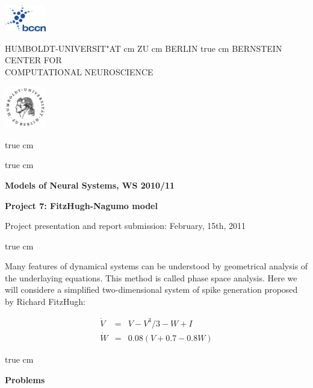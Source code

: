 \documentclass[12pt]{article}
\begin{document}
\parbox{2cm}{
\includegraphics[width=1.8cm]{bccnlogo.pdf}
}
\parbox{11cm}{
\begin{center}
\large HUMBOLDT-UNIVERSIT"AT  cm ZU  cm BERLIN
 true cm
\mgross BERNSTEIN CENTER FOR\\ COMPUTATIONAL NEUROSCIENCE
\end{center}
}
\parbox{2cm}
{
\hfill
\includegraphics[width=1.8cm]{hublogo.pdf}
}

 true cm



 true cm
\centerline{\bf Models of Neural Systems, WS 2010/11}
\centerline{\bf Project 7: FitzHugh-Nagumo model}
\centerline{Project presentation and report submission: February, 15th, 2011}

 true cm


Many features of dynamical systems can be understood by geometrical
analysis of the underlaying equations. This method is called phase
space analysis. Here we will considere a simplified two-dimensional
system of spike generation proposed by Richard FitzHugh:

\begin{eqnarray} 
\dot{V} & = & V-V^3/3 - W + I \\ 
\dot{W} & = & 0.08(V+0.7 - 0.8W)
\end{eqnarray} 

 true cm

{\bf Problems}
\end{document}
